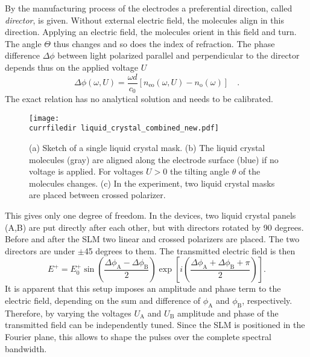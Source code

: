 By the manufacturing process of the electrodes a preferential direction, called \emph{director}, is given. Without external electric field, the molecules align in this direction.  Applying an electric field, the molecules orient in this field and turn. The angle $\Theta$ thus changes and so does the index of refraction. The phase difference $\Delta \phi$ between light polarized parallel and perpendicular to the director depends thus on the applied voltage $U$
\begin{equation}
	\Delta\phi(\omega,U) = \frac{\omega d}{c_{0}} \left[ n_{\text{eo}}(\omega,U) - n_{\text{o}}(\omega) \right] \quad .
\end{equation}
The exact relation has no analytical solution and needs to be calibrated.

\begin{figure}
	\centering
	\texttt{[image: \\currfiledir liquid\_crystal\_combined\_new.pdf]}
	\caption{(a) Sketch of a single liquid crystal mask. (b) The liquid crystal molecules (gray) are aligned along the electrode surface (blue) if no voltage is applied. For voltages ${U>0}$ the tilting angle $\theta$ of the molecules changes. (c) In the experiment, two liquid crystal masks are placed between crossed polarizer.}
	\label{fig:3-lq-display}
	\end{figure}

This gives only one degree of freedom. In the devices, two liquid crystal panels (A,B) are put directly after each other, but with directors rotated by 90 degrees. Before and after the SLM two linear and crossed polarizers are placed. The two directors are under $\pm$45 degrees to them.  The transmitted electric field is then
\begin{equation}
	E^{+} = E_{0}^{+} \sin\left(\frac{\Delta\phi_{\text{A}}-\Delta\phi_{\text{B}}}{2}\right) \exp\left[ i \left(\frac{\Delta\phi_{\text{A}}+\Delta\phi_{\text{B}}+\pi}{2}\right) \right].
	\label{eq:3_theory-transmitted-E}
\end{equation}
It is apparent that this setup imposes an amplitude and phase term to the electric field, depending on the sum and difference of $\phi_{\text{A}}$ and $\phi_{\text{B}}$, respectively. Therefore, by varying the voltages $U_{\text{A}}$ and $U_{\text{B}}$ amplitude and phase of the transmitted field can be independently tuned. Since the SLM is positioned in the Fourier plane, this allows to shape the pulses over the complete spectral bandwidth.

  


